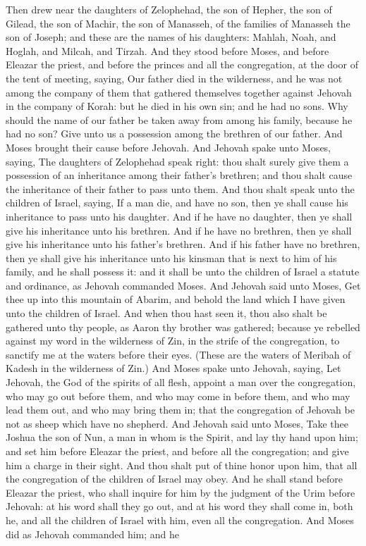 Then drew near the daughters of Zelophehad, the son of Hepher, the son of Gilead, the son of Machir, the son of Manasseh, of the families of Manasseh the son of Joseph; and these are the names of his daughters: Mahlah, Noah, and Hoglah, and Milcah, and Tirzah. And they stood before Moses, and before Eleazar the priest, and before the princes and all the congregation, at the door of the tent of meeting, saying, Our father died in the wilderness, and he was not among the company of them that gathered themselves together against Jehovah in the company of Korah: but he died in his own sin; and he had no sons. Why should the name of our father be taken away from among his family, because he had no son? Give unto us a possession among the brethren of our father. And Moses brought their cause before Jehovah.  And Jehovah spake unto Moses, saying, The daughters of Zelophehad speak right: thou shalt surely give them a possession of an inheritance among their father’s brethren; and thou shalt cause the inheritance of their father to pass unto them. And thou shalt speak unto the children of Israel, saying, If a man die, and have no son, then ye shall cause his inheritance to pass unto his daughter. And if he have no daughter, then ye shall give his inheritance unto his brethren. And if he have no brethren, then ye shall give his inheritance unto his father’s brethren. And if his father have no brethren, then ye shall give his inheritance unto his kinsman that is next to him of his family, and he shall possess it: and it shall be unto the children of Israel a statute and ordinance, as Jehovah commanded Moses.  And Jehovah said unto Moses, Get thee up into this mountain of Abarim, and behold the land which I have given unto the children of Israel. And when thou hast seen it, thou also shalt be gathered unto thy people, as Aaron thy brother was gathered; because ye rebelled against my word in the wilderness of Zin, in the strife of the congregation, to sanctify me at the waters before their eyes. (These are the waters of Meribah of Kadesh in the wilderness of Zin.)  And Moses spake unto Jehovah, saying, Let Jehovah, the God of the spirits of all flesh, appoint a man over the congregation, who may go out before them, and who may come in before them, and who may lead them out, and who may bring them in; that the congregation of Jehovah be not as sheep which have no shepherd. And Jehovah said unto Moses, Take thee Joshua the son of Nun, a man in whom is the Spirit, and lay thy hand upon him; and set him before Eleazar the priest, and before all the congregation; and give him a charge in their sight. And thou shalt put of thine honor upon him, that all the congregation of the children of Israel may obey. And he shall stand before Eleazar the priest, who shall inquire for him by the judgment of the Urim before Jehovah: at his word shall they go out, and at his word they shall come in, both he, and all the children of Israel with him, even all the congregation. And Moses did as Jehovah commanded him; and he 